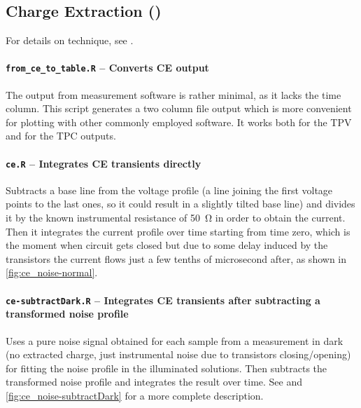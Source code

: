 

	\subsection{Charge Extraction ()}\label{r_ce}
		For details on  technique, see .

		\paragraph{\texttt{from\_ce\_to\_table.R} -- Converts CE output}
		The output from  measurement software is rather minimal, as it lacks the time column.
		This script generates a two column file output which is more convenient for plotting with other commonly employed software.
		It works both for the TPV and for the TPC outputs.

		\paragraph{\texttt{ce.R} -- Integrates CE transients directly}
		Subtracts a base line from the voltage profile (a line joining the first voltage points to the last ones, so it could result in a slightly tilted base line) and divides it by the known instrumental resistance of \SI{50}{\ohm} in order to obtain the current.
		Then it integrates the current profile over time starting from time zero, which is the moment when circuit gets closed but due to some delay induced by the transistors the current flows just a few tenths of microsecond after, as shown in \cref{fig:ce_noise-normal}.

		\paragraph{\texttt{ce-\-subtractDark.R} -- Integrates CE transients after subtracting a transformed noise profile}
		Uses a pure noise signal obtained for each sample from a measurement in dark (no extracted charge, just instrumental noise due to transistors closing/opening) for fitting the noise profile in the illuminated solutions.
		Then subtracts the transformed noise profile and integrates the result over time.
		See  and \cref{fig:ce_noise-subtractDark} for a more complete description.

